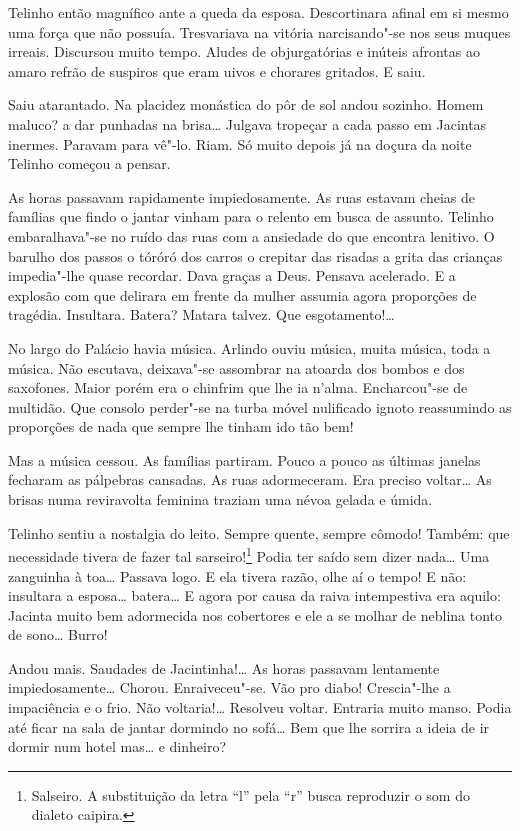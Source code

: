 Telinho então magnífico ante a queda da esposa. Descortinara afinal em
si mesmo uma força que não possuía. Tresvariava na vitória narcisando"-se
nos seus muques irreais. Discursou muito tempo. Aludes de objurgatórias
e inúteis afrontas ao amaro refrão de suspiros que eram uivos e chorares
gritados. E saiu.

Saiu atarantado. Na placidez monástica do pôr de sol andou sozinho.
Homem maluco? a dar punhadas na brisa\ldots{} Julgava tropeçar a cada passo
em Jacintas inermes. Paravam para vê"-lo. Riam. Só muito depois já na
doçura da noite Telinho começou a pensar.

As horas passavam rapidamente impiedosamente. As ruas estavam cheias de
famílias que findo o jantar vinham para o relento em busca de assunto.
Telinho embaralhava"-se no ruído das ruas com a ansiedade do que encontra
lenitivo. O barulho dos passos o tóróró dos carros o crepitar das
risadas a grita das crianças impedia"-lhe quase recordar. Dava graças a
Deus. Pensava acelerado. E a explosão com que delirara em frente da
mulher assumia agora proporções de tragédia. Insultara. Batera? Matara
talvez. Que esgotamento!\ldots{}

No largo do Palácio havia música. Arlindo ouviu música, muita música,
toda a música. Não escutava, deixava"-se assombrar na atoarda dos bombos
e dos saxofones. Maior porém era o chinfrim que lhe ia n'alma.
Encharcou"-se de multidão. Que consolo perder"-se na turba móvel
nulificado ignoto reassumindo as proporções de nada que sempre lhe
tinham ido tão bem!

Mas a música cessou. As famílias partiram. Pouco a pouco as últimas
janelas fecharam as pálpebras cansadas. As ruas adormeceram. Era preciso
voltar\ldots{} As brisas numa reviravolta feminina traziam uma névoa gelada e
úmida.

Telinho sentiu a nostalgia do leito. Sempre quente, sempre cômodo!
Também: que necessidade tivera de fazer tal sarseiro!\footnote{Salseiro.
  A substituição da letra ``l'' pela ``r'' busca reproduzir o som do
  dialeto caipira.} Podia ter saído sem dizer nada\ldots{} Uma zanguinha à
toa\ldots{} Passava logo. E ela tivera razão, olhe aí o tempo! E não:
insultara a esposa\ldots{} batera\ldots{} E agora por causa da raiva intempestiva
era aquilo: Jacinta muito bem adormecida nos cobertores e ele a se
molhar de neblina tonto de sono\ldots{} Burro!

Andou mais. Saudades de Jacintinha!\ldots{} As horas passavam lentamente
impiedosamente\ldots{} Chorou. Enraiveceu"-se. Vão pro diabo! Crescia"-lhe a
impaciência e o frio. Não voltaria!\ldots{} Resolveu voltar. Entraria muito
manso. Podia até ficar na sala de jantar dormindo no sofá\ldots{} Bem que lhe
sorrira a ideia de ir dormir num hotel mas\ldots{} e dinheiro?

